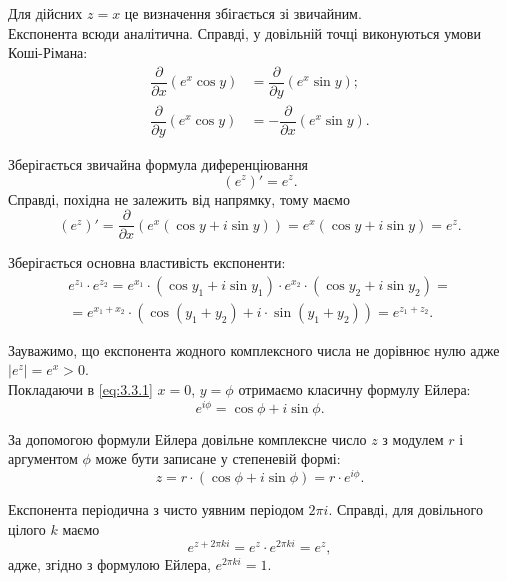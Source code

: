 Для дійсних $z = x$ це визначення збігається зі звичайним. \\

Експонента всюди аналітична. Справді, у довільній точці виконуються умови Коші-Рімана:
\begin{align}
	\label{eq:3.3.2}
	\dfrac{\partial}{\partial x} (e^x \cos y) &= \dfrac{\partial}{\partial y} (e^x \sin y); \\
	\label{eq:3.3.3}
	\dfrac{\partial}{\partial y} (e^x \cos y) &= - \dfrac{\partial}{\partial x} (e^x \sin y).
\end{align}

Зберігається звичайна формула диференціювання
\begin{equation}
	\label{eq:3.3.4}
	(e^z)' = e^z.
\end{equation}
Справді, похідна не залежить від напрямку, тому маємо
\begin{equation}
	\label{eq:3.3.5}
	(e^z)' = \dfrac{\partial}{\partial x} (e^x (\cos y + i \sin y)) = e^x (\cos y + i \sin y) = e^z.
\end{equation}

Зберігається основна властивість експоненти:
\begin{multline}
	\label{eq:3.3.6}
	e^{z_1} \cdot e^{z_2} = e^{x_1} \cdot (\cos y_1 + i \sin y_1) \cdot e^{x_2} \cdot (\cos y_2 + i \sin y_2) = \\
	= e^{x_1 + x_2} \cdot (\cos(y_1 + y_2) + i \cdot \sin(y_1+y_2)) = e^{z_1 + z_2}.
\end{multline}

Зауважимо, що експонента жодного комплексного числа не дорівнює нулю адже $|e^z| = e^x > 0$. \\

Покладаючи в \eqref{eq:3.3.1} $x = 0$, $y = \phi$ отримаємо класичну формулу Ейлера:
\begin{equation}
	\label{eq:3.3.7}
	e^{i \phi} = \cos \phi + i \sin \phi.
\end{equation}

За допомогою формули Ейлера довільне комплексне число $z$ з модулем $r$ і аргументом $\phi$ може бути записане у степеневій формі:
\begin{equation}
	\label{eq:3.3.8}
	z = r \cdot (\cos \phi + i \sin \phi) = r \cdot e^{i \phi}.
\end{equation}

Експонента періодична з чисто уявним періодом $2 \pi i$. Справді, для довільного цілого $k$ маємо
\begin{equation}
	\label{eq:3.3.9}
	e^{z + 2 \pi k i} = e^z \cdot e^{2 \pi k i} = e^z,
\end{equation}
адже, згідно з формулою Ейлера, $e^{2 \pi k i} = 1$. \\

